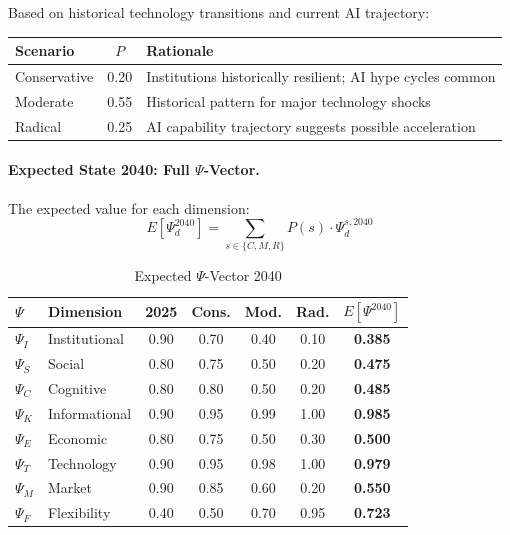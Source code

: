 Based on historical technology transitions and current AI trajectory:

\begin{center}
\renewcommand{\arraystretch}{1.3}
\begin{tabular}{@{}lcp{7cm}@{}}
\toprule
\textbf{Scenario} & $P$ & \textbf{Rationale} \\
\midrule
Conservative & 0.20 & Institutions historically resilient; AI hype cycles common \\
Moderate & 0.55 & Historical pattern for major technology shocks \\
Radical & 0.25 & AI capability trajectory suggests possible acceleration \\
\bottomrule
\end{tabular}
\end{center}

\paragraph{Expected State 2040: Full $\Psi$-Vector.}

The expected value for each dimension:
\begin{equation}
E[\Psi_d^{2040}] = \sum_{s \in \{C,M,R\}} P(s) \cdot \Psi_d^{s,2040}
\end{equation}

\begin{table}[htbp]
\centering
\caption{Expected $\Psi$-Vector 2040}
\label{tab:expected-psi-2040}
\renewcommand{\arraystretch}{1.3}
\small
\begin{tabular}{@{}llcccc|c@{}}
\toprule
$\Psi$ & \textbf{Dimension} & \textbf{2025} & \textbf{Cons.} & \textbf{Mod.} & \textbf{Rad.} & $E[\Psi^{2040}]$ \\
\midrule
$\Psi_I$ & Institutional & 0.90 & 0.70 & 0.40 & 0.10 & \textbf{0.385} \\
$\Psi_S$ & Social & 0.80 & 0.75 & 0.50 & 0.20 & \textbf{0.475} \\
$\Psi_C$ & Cognitive & 0.80 & 0.80 & 0.50 & 0.20 & \textbf{0.485} \\
$\Psi_K$ & Informational & 0.90 & 0.95 & 0.99 & 1.00 & \textbf{0.985} \\
$\Psi_E$ & Economic & 0.80 & 0.75 & 0.50 & 0.30 & \textbf{0.500} \\
$\Psi_T$ & Technology & 0.90 & 0.95 & 0.98 & 1.00 & \textbf{0.979} \\
$\Psi_M$ & Market & 0.90 & 0.85 & 0.60 & 0.20 & \textbf{0.550} \\
$\Psi_F$ & Flexibility & 0.40 & 0.50 & 0.70 & 0.95 & \textbf{0.723} \\
\bottomrule
\end{tabular}
\end{table}

